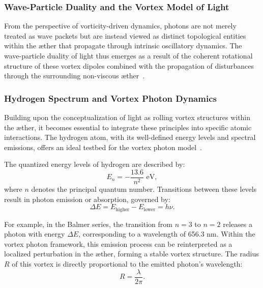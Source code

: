 \subsubsection*{Wave-Particle Duality and the Vortex Model of Light}\label{subsubsec:wave-particle-duality}
From the perspective of vorticity-driven dynamics, photons are not merely treated as wave packets but are instead viewed as distinct topological entities within the \ae ther that propagate through intrinsic oscillatory dynamics.
The wave-particle duality of light thus emerges as a result of the coherent rotational structure of these vortex dipoles combined with the propagation of disturbances through the surrounding non-viscous \ae ther~\cite{kleckner2016, orlandi2021}.

\subsubsection*{Hydrogen Spectrum and Vortex Photon Dynamics}
Building upon the conceptualization of light as rolling vortex structures within the \ae ther, it becomes essential to integrate these principles into specific atomic interactions.
The hydrogen atom, with its well-defined energy levels and spectral emissions, offers an ideal testbed for the vortex photon model~\cite{maxwell1861, clausius1865}.

The quantized energy levels of hydrogen are described by:
\begin{equation}
    E_n = -\frac{13.6}{n^2} \text{ eV},\label{eq:quantized energy levels}
\end{equation}
where $n$ denotes the principal quantum number.
Transitions between these levels result in photon emission or absorption, governed by:
\begin{equation}
    \Delta E = E_{\text{higher}} - E_{\text{lower}} = h \nu.\label{eq:emission or absorption}
\end{equation}

For example, in the Balmer series, the transition from $n=3$ to $n=2$ releases a photon with energy $\Delta E$, corresponding to a wavelength of 656.3 nm.
Within the vortex photon framework, this emission process can be reinterpreted as a localized perturbation in the \ae ther, forming a stable vortex structure.
The radius $R$ of this vortex is directly proportional to the emitted photon’s wavelength:
\begin{equation}
    R = \frac{\lambda}{2\pi}.\label{eq:photon wavelength}
\end{equation}

